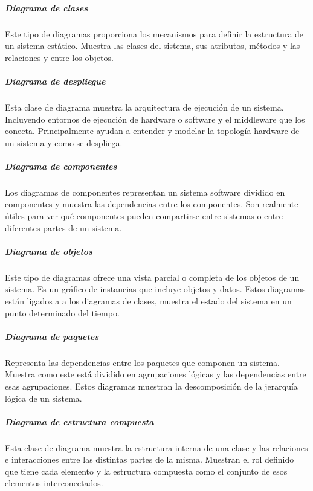 \documentclass[a4paper, 12pt]{book}
\begin{document}
\subparagraph{Diagrama de clases}
Este tipo de diagramas proporciona los mecanismos para definir la estructura de un sistema estático. Muestra las clases del sistema, sus atributos, métodos y las relaciones y entre los objetos. 
\subparagraph{Diagrama de despliegue}
Esta clase de diagrama muestra la arquitectura de ejecución de un sistema. Incluyendo entornos de ejecución de hardware o software y el middleware que los conecta. Principalmente ayudan a entender y modelar la topología hardware de un sistema y como se despliega. 
\subparagraph{Diagrama de componentes} Los diagramas de componentes representan un sistema software dividido en componentes y muestra las dependencias entre los componentes. Son realmente útiles para ver qué componentes pueden compartirse entre sistemas o entre diferentes partes de un sistema.  
\subparagraph{Diagrama de objetos}
Este tipo de diagramas ofrece una vista parcial o completa de los objetos de un sistema. Es un gráfico de instancias que incluye objetos y datos. Estos diagramas están ligados a a los diagramas de clases, muestra el estado del sistema en un punto determinado del tiempo. 
\subparagraph{Diagrama de paquetes}
Representa las dependencias entre los paquetes que componen un sistema. Muestra como este está dividido en agrupaciones lógicas y las dependencias entre esas agrupaciones. Estos diagramas muestran la descomposición de la jerarquía lógica de un sistema.  
\subparagraph{Diagrama de estructura compuesta}
Esta clase de diagrama muestra la estructura interna de una clase y las relaciones e interacciones entre las distintas partes de la misma. Muestran el rol definido que tiene cada elemento y la estructura compuesta como el conjunto de esos elementos interconectados.
\end{document}
